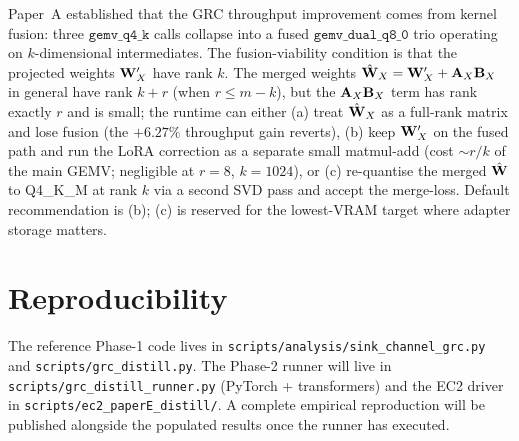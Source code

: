 \documentclass[11pt]{article}
\begin{document}
Paper~A established that the GRC throughput improvement comes from
kernel fusion: three $\texttt{gemv\_q4\_k}$ calls collapse into a
fused $\texttt{gemv\_dual\_q8\_0}$ trio operating on
$k$-dimensional intermediates. The fusion-viability condition is that
the projected weights $\mathbf{W}_X^\prime$ have rank $k$. The merged
weights $\hat{\mathbf{W}}_X = \mathbf{W}_X^\prime + \mathbf{A}_X \mathbf{B}_X$ in general
have rank $k + r$ (when $r \le m - k$), but the $\mathbf{A}_X \mathbf{B}_X$
term has rank exactly $r$ and is small; the runtime can either
(a) treat $\hat{\mathbf{W}}_X$ as a full-rank matrix and lose fusion (the
$+6.27\%$ throughput gain reverts), (b) keep $\mathbf{W}_X^\prime$ on the
fused path and run the LoRA correction as a separate small
matmul-add (cost $\sim r/k$ of the main GEMV; negligible at $r{=}8$,
$k{=}1024$), or (c) re-quantise the merged $\hat{\mathbf{W}}$ to Q4\_K\_M
at rank $k$ via a second SVD pass and accept the merge-loss. Default
recommendation is (b); (c) is reserved for the lowest-VRAM target
where adapter storage matters.

\section{Reproducibility}
\label{sec:repro}

The reference Phase-1 code lives in
\texttt{scripts/analysis/sink\_channel\_grc.py} and
\texttt{scripts/grc\_distill.py}. The Phase-2 runner will live in
\texttt{scripts/grc\_distill\_runner.py} (PyTorch + transformers) and
the EC2 driver in \texttt{scripts/ec2\_paperE\_distill/}. A complete
empirical reproduction will be published alongside the populated
results once the runner has executed.

\printbibliography
\end{document}
